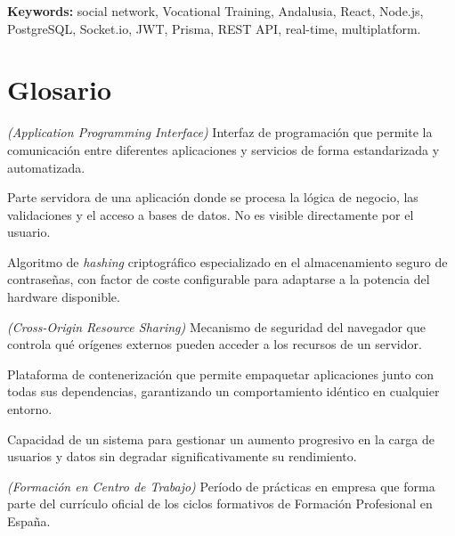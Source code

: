 \documentclass[a4paper]{report}
\begin{document}
\bigskip
\noindent\textbf{Keywords:} social network, Vocational Training, Andalusia, React, Node.js, PostgreSQL, Socket.io, JWT, Prisma, REST API, real-time, multiplatform.

\newpage

\chapter*{Glosario}

\begin{description}[leftmargin=3.5cm, style=nextline]

  \item[\textbf{API}] \textit{(Application Programming Interface)} Interfaz de programación que permite la comunicación entre diferentes aplicaciones y servicios de forma estandarizada y automatizada.

  \item[\textbf{Backend}] Parte servidora de una aplicación donde se procesa la lógica de negocio, las validaciones y el acceso a bases de datos. No es visible directamente por el usuario.

  \item[\textbf{Bcrypt}] Algoritmo de \textit{hashing} criptográfico especializado en el almacenamiento seguro de contraseñas, con factor de coste configurable para adaptarse a la potencia del hardware disponible.

  \item[\textbf{CORS}] \textit{(Cross-Origin Resource Sharing)} Mecanismo de seguridad del navegador que controla qué orígenes externos pueden acceder a los recursos de un servidor.

  \item[\textbf{Docker}] Plataforma de contenerización que permite empaquetar aplicaciones junto con todas sus dependencias, garantizando un comportamiento idéntico en cualquier entorno.

  \item[\textbf{Escalabilidad}] Capacidad de un sistema para gestionar un aumento progresivo en la carga de usuarios y datos sin degradar significativamente su rendimiento.

  \item[\textbf{FCT}] \textit{(Formación en Centro de Trabajo)} Período de prácticas en empresa que forma parte del currículo oficial de los ciclos formativos de Formación Profesional en España.


\end{description}
\end{document}
